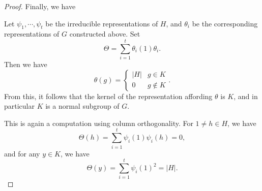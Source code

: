 \documentclass[a4paper]{article}
\begin{document}
\begin{proof}
  Finally, we have
  \begin{claim}
    Let $\psi_1, \cdots, \psi_t$ be the irreducible representations of $H$, and $\theta_i$ be the corresponding representations of $G$ constructed above. Set
    \[
      \Theta = \sum_{i = 1}^t \theta_i(1) \theta_i.
    \]
    Then we have
    \[
      \theta(g) =
      \begin{cases}
        |H| & g \in K\\
        0 & g \not \in K
      \end{cases}.
    \]
    From this, it follows that the kernel of the representation affording $\theta$ is $K$, and in particular $K$ is a normal subgroup of $G$.
  \end{claim}
  This is again a computation using column orthogonality. For $1 \not= h \in H$, we have
  \[
    \Theta(h) = \sum_{i = 1}^t \psi_i(1) \psi_i(h) = 0,
  \]
  and for any $y \in K$, we have
  \[
    \Theta(y) = \sum_{i = 1}^t \psi_i(1)^2 = |H|.
  \]
%
%
%

\end{proof}
\end{document}
